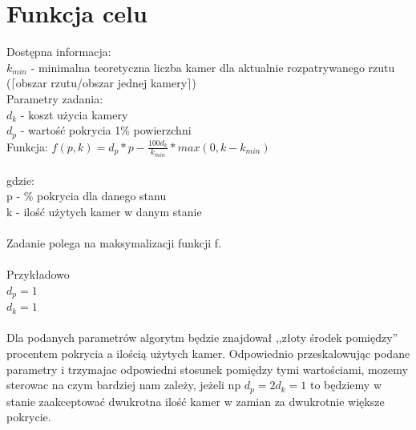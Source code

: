 \documentclass[12pt,a4paper]{article}
\begin{document}
\section{Funkcja celu}
Dostępna informacja: \\
\footnotesize
$k_{min}$ - minimalna teoretyczna liczba kamer dla
aktualnie rozpatrywanego rzutu \\ 
\indent ($\lceil$obszar rzutu/obszar jednej kamery$\rceil$) \\
\normalsize
%
\newline
Parametry zadania: \\
$d_k$ - koszt użycia kamery \\
$d_p$ - wartość pokrycia 1\% powierzchni\\
%
\newline
Funkcja:
$f(p, k) = d_p*p - \frac{100d_k}{k_{min}}*max(0,k - k_{min}) $ \\ \\
gdzie: \\
p - \% pokrycia dla danego stanu \\
k - ilość użytych kamer w danym stanie \\ \\
Zadanie polega na maksymalizacji funkcji f. \\ \\ 
Przykładowo \\
$ d_p = 1$ \\
$ d_k = 1$ \\ \\ 
Dla podanych parametrów algorytm będzie znajdował ,,złoty środek pomiędzy''
procentem pokrycia a ilością użytych kamer.
Odpowiednio przeskalowując podane parametry i trzymajac odpowiedni
stosunek pomiędzy tymi wartościami,
mozemy sterowac na czym bardziej nam zależy, jeżeli np
$d_p = 2d_k = 1 $ to będziemy w stanie zaakceptować dwukrotna
ilość kamer w zamian za dwukrotnie większe pokrycie.
%
\end{document}
